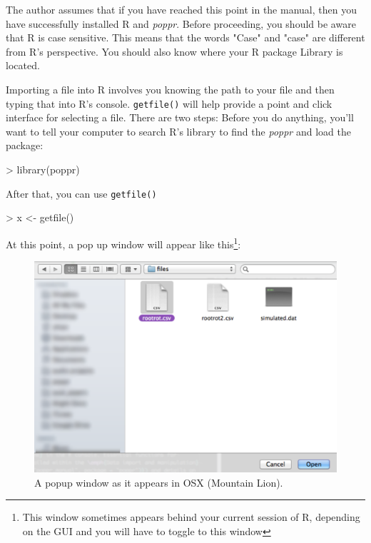 \documentclass[letterpaper]{article}
\newcommand{\tab}{\hspace*{1em}}
\begin{document}
\tab\tab The author assumes that if you have reached this point in the manual, then you have successfully installed R and \textit{poppr}. Before proceeding, you should be aware that R is case sensitive. This means that the words "Case" and "case" are different from R's perspective. You should also know where your R package Library is located.
\begin{center}
\end{center}
Importing a file into R involves you knowing the path to your file and then typing that into R's console. \texttt{getfile()} will help provide a point and click interface for selecting a file. There are two steps:
Before you do anything, you'll want to tell your computer to search R's library to find the \textit{poppr} and load the package:
\begin{Schunk}
\begin{Sinput}
> library(poppr)
\end{Sinput}
\end{Schunk}
After that, you can use \texttt{getfile()}
\begin{Schunk}
\begin{Sinput}
> x <- getfile()
\end{Sinput}
\end{Schunk}
At this point, a pop up window will appear like this\footnote{This window sometimes appears behind your current session of R, depending on the GUI and you will have to toggle to this window}:
\begin{figure}[h!]
  \centering
  \caption{A popup window as it appears in OSX (Mountain Lion).}
  \label{getfile window}
\includegraphics{getfile}
\end{figure}
\end{document}

